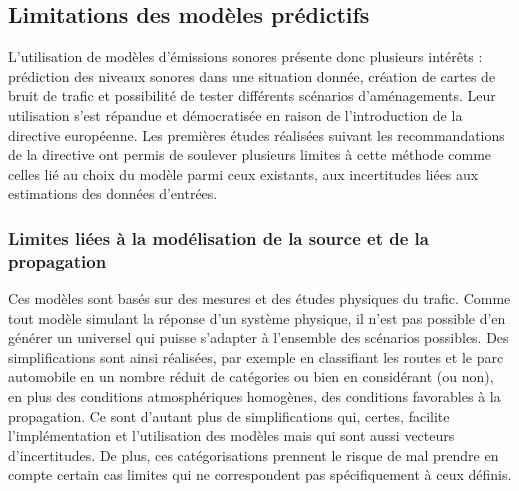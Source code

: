 \subsection{Limitations des modèles prédictifs}

L'utilisation de modèles d'émissions sonores présente donc plusieurs intérêts : prédiction des niveaux sonores dans une situation donnée, création de cartes de bruit de trafic et possibilité de tester différents scénarios d'aménagements. Leur utilisation s'est répandue et démocratisée en raison de l'introduction de la directive européenne. Les premières études réalisées suivant les recommandations de la directive ont permis de soulever plusieurs limites à cette méthode comme celles lié au choix du modèle parmi ceux existants, aux incertitudes liées aux estimations des données d'entrées.

\subsubsection{Limites liées à la modélisation de la source et de la propagation}

Ces modèles sont basés sur des mesures et des études physiques du trafic. Comme tout modèle simulant la réponse d'un système physique, il n'est pas possible d'en générer un universel qui puisse s'adapter à l'ensemble des scénarios possibles. Des simplifications sont ainsi réalisées, par exemple en classifiant les routes et le parc automobile en un nombre réduit de catégories ou bien en considérant (ou non), en plus des conditions atmosphériques homogènes, des conditions favorables à la propagation. Ce sont d'autant plus de simplifications qui, certes, facilite l'implémentation et l'utilisation des modèles mais qui sont aussi vecteurs d'incertitudes. De plus, ces catégorisations prennent le risque de mal prendre en compte certain cas limites qui ne correspondent pas spécifiquement à ceux définis.

